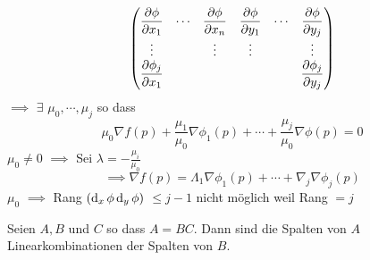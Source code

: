 \begin{Bew}
\[\begin{pmatrix}
    \dfrac{\partial \phi}{\partial x_1}&\cdots&\dfrac{\partial \phi}{\partial x_n}&\dfrac{\partial \phi}{\partial y_1}&\cdots&\dfrac{\partial \phi}{\partial y_j}\\
    \vdots&&\vdots&\vdots&&\vdots\\
    \dfrac{\partial \phi_j}{\partial x_1}&&&&&\dfrac{\partial \phi_j}{\partial y_j}
  \end{pmatrix}\]
  $\implies$ $\exists$ $\mu_0,\cdots,\mu_j$ so dass
  \[\mu_0\nabla f(p)+\frac{\mu_1}{\mu_0}\nabla\phi_1(p)+\cdots+\frac{\mu_j}{\mu_0}\nabla\phi(p)=0\]
  $\mu_0\neq 0$ $\implies$ Sei $\lambda=-\frac{\mu_i}{\mu_0}$
  \[\implies\nabla f(p)=\Lambda_1\nabla\phi_1(p)+\cdots+\nabla_j\nabla\phi_j(p)\]
  $\mu_0$ $\implies$ Rang $(\operatorname{d}_x\phi \operatorname{d}_y\phi)$ $\leq j-1$ nicht möglich weil Rang $=j$
\end{Bew}
\begin{Lem}
  Seien $A,B$ und $C$ so dass $A=BC$. Dann sind die Spalten von $A$ Linearkombinationen der Spalten von $B$.
\end{Lem}
